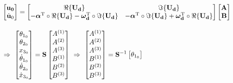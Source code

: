 \documentclass[a4paper,12pt,oneside]{article}
\begin{document}
\begin{align}
\label{eqn:coefficients_from_initial_conditions}
	& \begin{bmatrix}
			\mathbf{u_0} \\
			\dot{\mathbf{u}}_0
		\end{bmatrix} =
			\begin{bmatrix}
				\Re\{\mathbf{U_d}\} &	\Im\{\mathbf{U_d}\} \\
				-\bm{\alpha}^\textup{T} \circ \Re\{\mathbf{U_d}\} -
					\bm{\omega_\textup{\textbf{d}}}^\textup{T} \circ \Im\{\mathbf{U_d}\} &
					-\bm{\alpha}^\textup{T} \circ \Im\{\mathbf{U_d}\} +
					\bm{\omega_\textup{\textbf{d}}}^\textup{T} \circ \Re\{\mathbf{U_d}\}
			\end{bmatrix} \begin{bmatrix}
										\mathbf{A} \\
										\mathbf{B}
									\end{bmatrix} \notag \\[10pt]
	& \Rightarrow ~ \begin{bmatrix}
										\theta_{1_0} \\
										\theta_{2_0} \\
										x_{3_0}	\\
										\dot{\theta}_{1_0} \\
										\dot{\theta}_{2_0} \\
										\dot{x}_{3_0}
									\end{bmatrix} = \mathbf{S}	\begin{bmatrix}
																								A^{(1)} \\
																								A^{(2)} \\
																								A^{(3)} \\
																								B^{(1)}	\\
																								B^{(2)}	\\
																								B^{(3)}
																							\end{bmatrix} ~ \Rightarrow ~
		\begin{bmatrix}
			A^{(1)} \\
			A^{(2)} \\
			A^{(3)} \\
			B^{(1)}	\\
			B^{(2)}	\\
			B^{(3)}
		\end{bmatrix} = \mathbf{S}^{-1} \begin{bmatrix}
																			\theta_{1_0} \\

\end{bmatrix}
\end{align}
\end{document}
